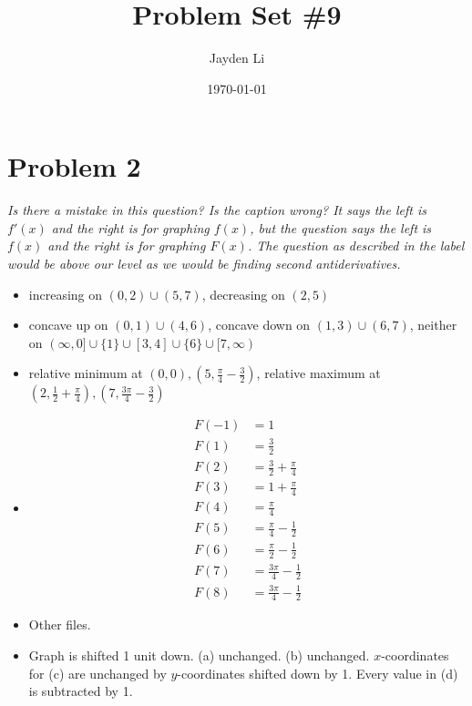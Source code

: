 \documentclass[preview, margin=0.6in]{standalone}
\title{\vspace*{-30pt}Problem Set \#9}
\author{Jayden Li}
\date{\today}
\newcommand*{\problem}[1]{\section*{Problem #1}}
\begin{document}
\fontsize{12pt}{12pt}\selectfont
\setlength{\abovedisplayskip}{0pt}
\maketitle
\problem{2}
\textit{Is there a mistake in this question? Is the caption wrong? It says the left is $f'(x)$ and the right is for graphing $f(x)$, but the question says the left is $f(x)$ and the right is for graphing $F(x)$. The question as described in the label would be above our level as we would be finding second antiderivatives.}
\begin{itemize}
	\item[(a)] increasing on $(0,2)\cup(5,7)$, decreasing on $(2,5)$
	\item[(b)] concave up on $(0,1)\cup(4,6)$, concave down on $(1,3)\cup(6,7)$, neither on $(\infty,0]\cup\{1\}\cup[3,4]\cup\{6\}\cup[7,\infty)$
	\item[(c)] relative minimum at $\displaystyle \left(0,0\right), \left(5,\frac{\pi}{4}-\frac{3}{2}\right)$, relative maximum at $\displaystyle \left(2,\frac{1}{2}+\frac{\pi}{4}\right), \left(7, \frac{3\pi}{4}-\frac{3}{2}\right)$
	\item[(d)]
		\begin{align*}
		    F(-1)&=1 \\
			F(1)&=\frac32 \\
			F(2)&=\frac32+\frac{\pi}{4} \\
			F(3)&=1+\frac{\pi}{4} \\
			F(4)&=\frac{\pi}{4} \\
			F(5)&=\frac{\pi}{4}-\frac{1}{2} \\ 
			F(6)&=\frac{\pi}{2}-\frac{1}{2} \\
			F(7)&=\frac{3\pi}{4}-\frac{1}{2} \\
			F(8)&=\frac{3\pi}{4}-\frac{1}{2}
		\end{align*}

	\item[(e)] Other files.

	\item[(f)] Graph is shifted 1 unit down. (a) unchanged. (b) unchanged. $x$-coordinates for (c) are unchanged by $y$-coordinates shifted down by 1. Every value in (d) is subtracted by 1.
\end{itemize}
\end{document}
